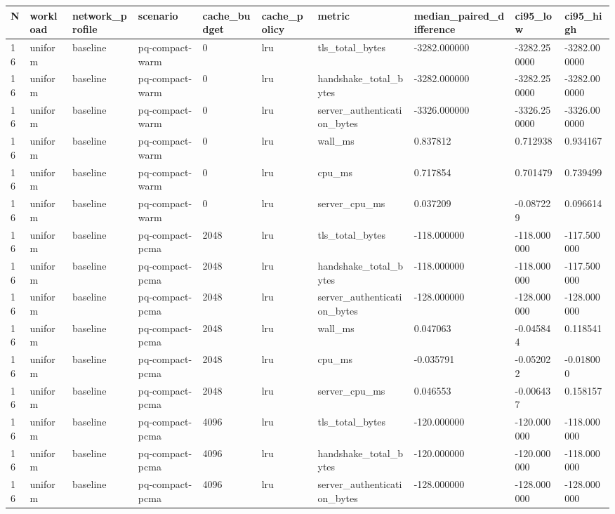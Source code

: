 \begin{tabular}{llllllllll}
N & workload & network\_profile & scenario & cache\_budget & cache\_policy & metric & median\_paired\_difference & ci95\_low & ci95\_high \\ \hline
16 & uniform & baseline & pq-compact-warm & 0 & lru & tls\_total\_bytes & -3282.000000 & -3282.250000 & -3282.000000 \\
16 & uniform & baseline & pq-compact-warm & 0 & lru & handshake\_total\_bytes & -3282.000000 & -3282.250000 & -3282.000000 \\
16 & uniform & baseline & pq-compact-warm & 0 & lru & server\_authentication\_bytes & -3326.000000 & -3326.250000 & -3326.000000 \\
16 & uniform & baseline & pq-compact-warm & 0 & lru & wall\_ms & 0.837812 & 0.712938 & 0.934167 \\
16 & uniform & baseline & pq-compact-warm & 0 & lru & cpu\_ms & 0.717854 & 0.701479 & 0.739499 \\
16 & uniform & baseline & pq-compact-warm & 0 & lru & server\_cpu\_ms & 0.037209 & -0.087229 & 0.096614 \\
16 & uniform & baseline & pq-compact-pcma & 2048 & lru & tls\_total\_bytes & -118.000000 & -118.000000 & -117.500000 \\
16 & uniform & baseline & pq-compact-pcma & 2048 & lru & handshake\_total\_bytes & -118.000000 & -118.000000 & -117.500000 \\
16 & uniform & baseline & pq-compact-pcma & 2048 & lru & server\_authentication\_bytes & -128.000000 & -128.000000 & -128.000000 \\
16 & uniform & baseline & pq-compact-pcma & 2048 & lru & wall\_ms & 0.047063 & -0.045844 & 0.118541 \\
16 & uniform & baseline & pq-compact-pcma & 2048 & lru & cpu\_ms & -0.035791 & -0.052022 & -0.018000 \\
16 & uniform & baseline & pq-compact-pcma & 2048 & lru & server\_cpu\_ms & 0.046553 & -0.006437 & 0.158157 \\
16 & uniform & baseline & pq-compact-pcma & 4096 & lru & tls\_total\_bytes & -120.000000 & -120.000000 & -118.000000 \\
16 & uniform & baseline & pq-compact-pcma & 4096 & lru & handshake\_total\_bytes & -120.000000 & -120.000000 & -118.000000 \\
16 & uniform & baseline & pq-compact-pcma & 4096 & lru & server\_authentication\_bytes & -128.000000 & -128.000000 & -128.000000 \\

\end{tabular}
